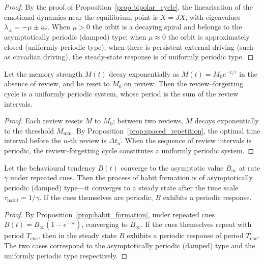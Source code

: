 \begin{proof}
By the proof of Proposition~\ref{prop:bipolar_cycle}, the linearisation of the emotional dynamics near the equilibrium point is $\dot X=JX$, with eigenvalues $\lambda_\pm=-\mu\pm i\omega$. When $\mu>0$ the orbit is a decaying spiral and belongs to the asymptotically periodic (damped) type; when $\mu\approx 0$ the orbit is approximately closed (uniformly periodic type); when there is persistent external driving (such as circadian driving), the steady-state response is of uniformly periodic type.
\end{proof}

\begin{lemma}\label{lem:memory_periodic}
Let the memory strength $M(t)$ decay exponentially as $M(t)=M_0 e^{-t/\tau}$ in the absence of review, and be reset to $M_0$ on review. Then the review--forgetting cycle is a uniformly periodic system, whose period is the sum of the review intervals.
\end{lemma}

\begin{proof}
Each review resets $M$ to $M_0$; between two reviews, $M$ decays exponentially to the threshold $M_{\min}$. By Proposition~\ref{prop:spaced_repetition}, the optimal time interval before the $n$-th review is $\Delta t_n$. When the sequence of review intervals is periodic, the review--forgetting cycle constitutes a uniformly periodic system.
\end{proof}

\begin{lemma}\label{lem:habit_periodic}
Let the behavioural tendency $B(t)$ converge to the asymptotic value $B_\infty$ at rate $\gamma$ under repeated cues. Then the process of habit formation is of asymptotically periodic (damped) type---it converges to a steady state after the time scale $\tau_{\text{habit}}=1/\gamma$. If the cues themselves are periodic, $B$ exhibits a periodic response.
\end{lemma}

\begin{proof}
By Proposition~\ref{prop:habit_formation}, under repeated cues $B(t)=B_\infty(1-e^{-\gamma t})$, converging to $B_\infty$. If the cues themselves repeat with period $T_{\text{cue}}$, then in the steady state $B$ exhibits a periodic response of period $T_{\text{cue}}$. The two cases correspond to the asymptotically periodic (damped) type and the uniformly periodic type respectively.
\end{proof}

